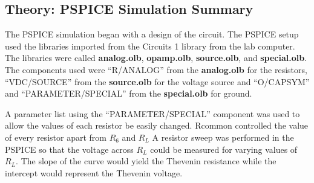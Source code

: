 \documentclass[11pt]{article}
\begin{document}
%
\subsection{Theory: PSPICE Simulation Summary}

The PSPICE simulation began with a design of the circuit. The PSPICE setup used the libraries imported from the Circuits 1 library from the lab computer. The libraries were called \textbf{analog.olb}, \textbf{opamp.olb}, \textbf{source.olb}, and \textbf{special.olb}. The components used were ``R/ANALOG'' from the \textbf{analog.olb} for the resistors, ``VDC/SOURCE'' from the \textbf{source.olb} for the voltage source and ``O/CAPSYM'' and ``PARAMETER/SPECIAL'' from the \textbf{special.olb} for ground.


A parameter list using the ``PARAMETER/SPECIAL'' component was used to allow the values of each resistor be easily changed. Rcommon controlled the value of every resistor apart from $R_6$ and $R_L$ A resistor sweep was performed in the PSPICE so that the voltage across $R_L$ could be measured for varying values of $R_L$. The slope of the curve would yield the Thevenin resistance while the intercept would represent the Thevenin voltage.

\end{document}
